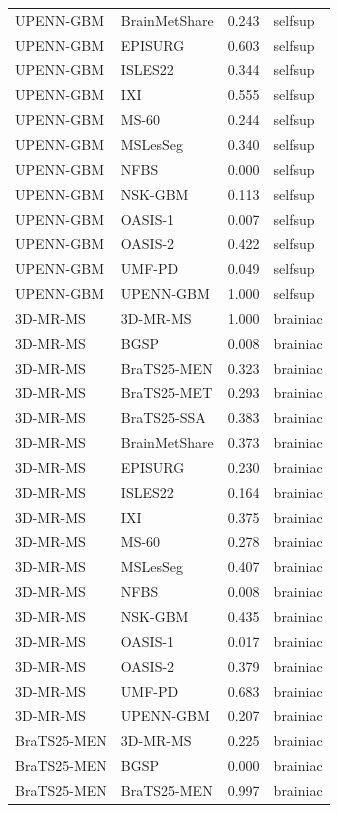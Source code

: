\begin{tabular}{llrl}
UPENN-GBM & BrainMetShare & 0.243 & selfsup \\
UPENN-GBM & EPISURG & 0.603 & selfsup \\
UPENN-GBM & ISLES22 & 0.344 & selfsup \\
UPENN-GBM & IXI & 0.555 & selfsup \\
UPENN-GBM & MS-60 & 0.244 & selfsup \\
UPENN-GBM & MSLesSeg & 0.340 & selfsup \\
UPENN-GBM & NFBS & 0.000 & selfsup \\
UPENN-GBM & NSK-GBM & 0.113 & selfsup \\
UPENN-GBM & OASIS-1 & 0.007 & selfsup \\
UPENN-GBM & OASIS-2 & 0.422 & selfsup \\
UPENN-GBM & UMF-PD & 0.049 & selfsup \\
UPENN-GBM & UPENN-GBM & 1.000 & selfsup \\
3D-MR-MS & 3D-MR-MS & 1.000 & brainiac \\
3D-MR-MS & BGSP & 0.008 & brainiac \\
3D-MR-MS & BraTS25-MEN & 0.323 & brainiac \\
3D-MR-MS & BraTS25-MET & 0.293 & brainiac \\
3D-MR-MS & BraTS25-SSA & 0.383 & brainiac \\
3D-MR-MS & BrainMetShare & 0.373 & brainiac \\
3D-MR-MS & EPISURG & 0.230 & brainiac \\
3D-MR-MS & ISLES22 & 0.164 & brainiac \\
3D-MR-MS & IXI & 0.375 & brainiac \\
3D-MR-MS & MS-60 & 0.278 & brainiac \\
3D-MR-MS & MSLesSeg & 0.407 & brainiac \\
3D-MR-MS & NFBS & 0.008 & brainiac \\
3D-MR-MS & NSK-GBM & 0.435 & brainiac \\
3D-MR-MS & OASIS-1 & 0.017 & brainiac \\
3D-MR-MS & OASIS-2 & 0.379 & brainiac \\
3D-MR-MS & UMF-PD & 0.683 & brainiac \\
3D-MR-MS & UPENN-GBM & 0.207 & brainiac \\
BraTS25-MEN & 3D-MR-MS & 0.225 & brainiac \\
BraTS25-MEN & BGSP & 0.000 & brainiac \\
BraTS25-MEN & BraTS25-MEN & 0.997 & brainiac \\

\end{tabular}

